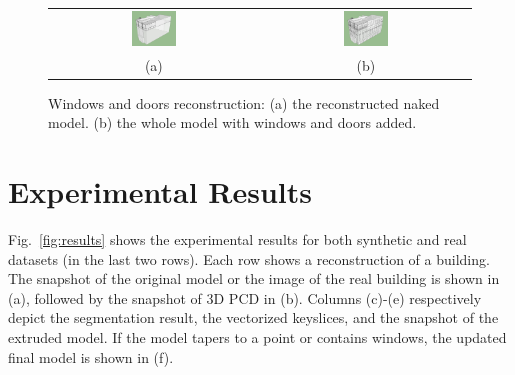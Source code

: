 \documentclass[10pt,journal,cspaper,compsoc]{IEEEtran}
\newcommand{\Fig}[1]{Fig.~\ref{fig:#1}}
\begin{document}
\begin{figure} [htbp]
\begin{center}
\begin{tabular}{cc}
\includegraphics[width=0.22\textwidth]{model_naked.png} &
\includegraphics[width=0.22\textwidth]{model_windows.png} \\
(a) & (b) 
\end{tabular}
\end{center}
\caption{ Windows and doors reconstruction:
      (a) the reconstructed naked model.
      (b) the whole model with windows and doors added.}
\label{fig:WDR_Fig1}
\end{figure}


\section{Experimental Results}
\label{sec:IR_OUT}

\Fig{results} shows the experimental results for both synthetic and 
real datasets (in the last two rows).
Each row shows a reconstruction of a building. 
The snapshot of the original model or the image of the real building
is shown in (a), followed by the snapshot of 3D PCD in (b).
Columns (c)-(e) respectively depict the segmentation result,
the vectorized keyslices, and the snapshot of the extruded model.
If the model tapers to a point or contains windows, 
the updated final model is shown in (f).
\end{document}
